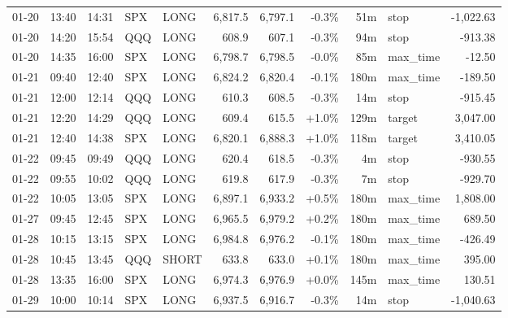 \documentclass[11pt,a4paper,twoside]{article}
\begin{document}
\begin{center}
\begin{longtable}{>{\color{txtmain}}l l l l l r r r r >{\color{txtmain}}l r}
01-20 & 13:40 & 14:31 & SPX & LONG & 6,817.5 & 6,797.1 & \textcolor{lossred}{-0.3\%} & 51m & stop & \textcolor{lossred}{-1,022.63} \\
01-20 & 14:20 & 15:54 & QQQ & LONG & 608.9 & 607.1 & \textcolor{lossred}{-0.3\%} & 94m & stop & \textcolor{lossred}{-913.38} \\
01-20 & 14:35 & 16:00 & SPX & LONG & 6,798.7 & 6,798.5 & \textcolor{lossred}{-0.0\%} & 85m & max\_time & \textcolor{lossred}{-12.50} \\
01-21 & 09:40 & 12:40 & SPX & LONG & 6,824.2 & 6,820.4 & \textcolor{lossred}{-0.1\%} & 180m & max\_time & \textcolor{lossred}{-189.50} \\
01-21 & 12:00 & 12:14 & QQQ & LONG & 610.3 & 608.5 & \textcolor{lossred}{-0.3\%} & 14m & stop & \textcolor{lossred}{-915.45} \\
01-21 & 12:20 & 14:29 & QQQ & LONG & 609.4 & 615.5 & \textcolor{wingreen}{+1.0\%} & 129m & target & \textcolor{wingreen}{3,047.00} \\
01-21 & 12:40 & 14:38 & SPX & LONG & 6,820.1 & 6,888.3 & \textcolor{wingreen}{+1.0\%} & 118m & target & \textcolor{wingreen}{3,410.05} \\
01-22 & 09:45 & 09:49 & QQQ & LONG & 620.4 & 618.5 & \textcolor{lossred}{-0.3\%} & 4m & stop & \textcolor{lossred}{-930.55} \\
01-22 & 09:55 & 10:02 & QQQ & LONG & 619.8 & 617.9 & \textcolor{lossred}{-0.3\%} & 7m & stop & \textcolor{lossred}{-929.70} \\
01-22 & 10:05 & 13:05 & SPX & LONG & 6,897.1 & 6,933.2 & \textcolor{wingreen}{+0.5\%} & 180m & max\_time & \textcolor{wingreen}{1,808.00} \\
01-27 & 09:45 & 12:45 & SPX & LONG & 6,965.5 & 6,979.2 & \textcolor{wingreen}{+0.2\%} & 180m & max\_time & \textcolor{wingreen}{689.50} \\
01-28 & 10:15 & 13:15 & SPX & LONG & 6,984.8 & 6,976.2 & \textcolor{lossred}{-0.1\%} & 180m & max\_time & \textcolor{lossred}{-426.49} \\
01-28 & 10:45 & 13:45 & QQQ & SHORT & 633.8 & 633.0 & \textcolor{wingreen}{+0.1\%} & 180m & max\_time & \textcolor{wingreen}{395.00} \\
01-28 & 13:35 & 16:00 & SPX & LONG & 6,974.3 & 6,976.9 & \textcolor{wingreen}{+0.0\%} & 145m & max\_time & \textcolor{wingreen}{130.51} \\
01-29 & 10:00 & 10:14 & SPX & LONG & 6,937.5 & 6,916.7 & \textcolor{lossred}{-0.3\%} & 14m & stop & \textcolor{lossred}{-1,040.63} \\

\end{longtable}
\end{center}
\end{document}
